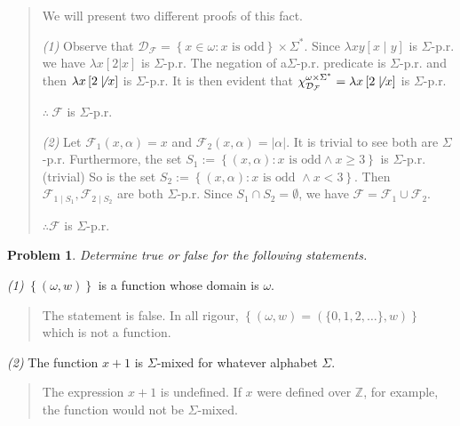 \documentclass[a4paper, 12pt]{article}
\newtheorem{problem}{Problem}
\newtheorem{problem}{Problem}
\begin{document}
\small
\begin{quote}

We will present two different proofs of this fact. 

\textit{(1)} Observe that $\mathcal{D}_{\mathcal{F}} = \left\{ x \in \omega :
x \text{ is odd} \right\} \times \Sigma^{*}$. Since $\lambda xy \left[  x \mid y
\right]$ is $\Sigma$-p.r. we have $\lambda x \left[ 2 | x  \right]$ is
$\Sigma$-p.r. The negation of a$\Sigma$-p.r. predicate is $\Sigma$-p.r. and then
$\lambda x \left[ 2 \not\mid x  \right]$ is $\Sigma$-p.r. It is then evident that
$\chi_{\mathcal{D}_{\mathcal{F}}}^{\omega \times \Sigma^{*}} = \lambda x \left[
2 \not\mid x\right]$ is $\Sigma$-p.r. 

$\therefore ~ \mathcal{F}$  is $\Sigma$-p.r. 

\textit{(2)} Let $\mathcal{F}_1(x, \alpha) = x$ and $\mathcal{F}_2(x, \alpha) =
|\alpha|$. It is trivial to see both are $\Sigma$-p.r. Furthermore, the set
$S_1 := \left\{ (x, \alpha) : x \text{ is odd} \land x \geq 3 \right\} $ is
$\Sigma$-p.r. (trivial) So is the set $S_2:=\left\{ (x, \alpha) : x \text{ is odd }
\land x < 3 \right\} $. Then $\mathcal{F}_{ 1\mid{S_1} }, \mathcal{F}_{2 \mid S_2}$ are
both $\Sigma$-p.r. Since $S_1 \cap  S_2 = \emptyset$, we have $\mathcal{F} =
\mathcal{F}_1 \cup \mathcal{F}_2$. 

$\therefore \mathcal{F}$ is $\Sigma$-p.r. 

\end{quote}
\normalsize

\begin{problem}
    Determine true or false for the following statements.
\end{problem}

\textit{(1)} $\left\{ (\omega, w) \right\} $ is a function whose domain is
$\omega$. 


\small
\begin{quote}

The statement is false. In all rigour, $\left\{ (\omega, w) = (\{0, 1, 2,
\ldots\}, w) \right\} $ which is not a function.

\end{quote}
\normalsize


\textit{(2)} The function $x + 1$ is $\Sigma$-mixed for whatever alphabet
$\Sigma$. 


\small
\begin{quote}

The expression $x + 1$ is undefined. If $x$ were defined over $\mathbb{Z}$, for
example, the function would not be $\Sigma$-mixed.

\end{quote}
\normalsize
\end{document}
